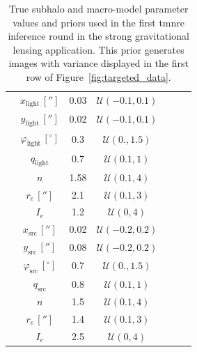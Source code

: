 \begin{subappendices}
\begin{table}
\begin{tabular}{c c c c c c c}
        & $x_\mathrm{light}\, ['']$ & 0.03 & $\mathcal{U}(-0.1, 0.1)$ \\
        & $y_\mathrm{light}\, ['']$ & 0.02 & $\mathcal{U}(-0.1, 0.1)$ \\
        & $\varphi_\mathrm{light} \, [^\circ]$ & 0.3 & $\mathcal{U}(0., 1.5)$ \\
        & $q_\mathrm{light}$ & 0.7 & $\mathcal{U}(0.1, 1)$ \\
        & $n$ & 1.58 & $\mathcal{U}(0.1, 4)$ \\
        & $r_e\, ['']$ & 2.1 & $\mathcal{U}(0.1, 3)$ \\
        & $I_e$ & 1.2 & $\mathcal{U}(0, 4)$ \\
        \hline
        \parbox[t]{1mm}{}
        & $x_\mathrm{src}\, ['']$ & 0.02 & $\mathcal{U}(-0.2, 0.2)$ \\
        & $y_\mathrm{src}\, ['']$ & 0.08 & $\mathcal{U}(-0.2, 0.2)$ \\
        & $\varphi_\mathrm{src} \, [^\circ]$ & 0.7 & $\mathcal{U}(0., 1.5)$ \\
        & $q_\mathrm{src}$ & 0.8 & $\mathcal{U}(0.1, 1)$ \\
        & $n$ & 1.5 & $\mathcal{U}(0.1, 4)$ \\
        & $r_e\, ['']$ & 1.4 & $\mathcal{U}(0.1, 3)$ \\
        & $I_e$ & 2.5 & $\mathcal{U}(0, 4)$ \\
        \hline
    \end{tabular}
    \caption{True subhalo and macro-model parameter values and priors used in the first \gls*{tmnre} inference round in the strong gravitational lensing application. This prior generates images with variance displayed in the first row of Figure~\ref{fig:targeted_data}.}
    \label{tab:anre-lensing-params}
\end{table}


\end{subappendices}
